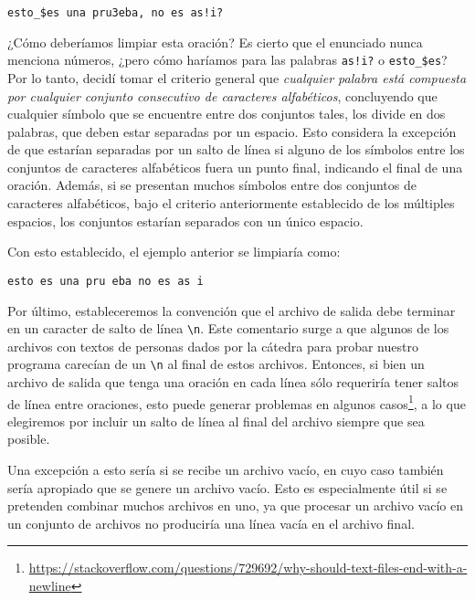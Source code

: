 \documentclass[a4paper]{article}
\begin{document}
\begin{tcolorbox}
    \texttt{esto\_\$es una pru3eba, no es as!i?}
\end{tcolorbox}

¿Cómo deberíamos limpiar esta oración? Es cierto que el enunciado nunca menciona números, ¿pero cómo haríamos para las palabras \texttt{as!i?} o \texttt{esto\_\$es}? Por lo tanto, decidí tomar el criterio general que \textit{cualquier palabra está compuesta por cualquier conjunto consecutivo de caracteres alfabéticos}, concluyendo que cualquier símbolo que se encuentre entre dos conjuntos tales, los divide en dos palabras, que deben estar separadas por un espacio. Esto considera la excepción de que estarían separadas por un salto de línea si alguno de los símbolos entre los conjuntos de caracteres alfabéticos fuera un punto final, indicando el final de una oración. Además, si se presentan muchos símbolos entre dos conjuntos de caracteres alfabéticos, bajo el criterio anteriormente establecido de los múltiples espacios, los conjuntos estarían separados con un único espacio.

Con esto establecido, el ejemplo anterior se limpiaría como:

\begin{tcolorbox}
    \texttt{esto es una pru eba no es as i}
\end{tcolorbox}

\vspace{10pt}

Por último, estableceremos la convención que el archivo de salida debe terminar en un caracter de salto de línea \texttt{\textbackslash{}n}. Este comentario surge a que algunos de los archivos con textos de personas dados por la cátedra para probar nuestro programa carecían de un \texttt{\textbackslash{}n} al final de estos archivos. Entonces, si bien un archivo de salida que tenga una oración en cada línea sólo requeriría tener saltos de línea entre oraciones, esto puede generar problemas en algunos casos\footnote{\url{https://stackoverflow.com/questions/729692/why-should-text-files-end-with-a-newline}}, a lo que elegiremos por incluir un salto de línea al final del archivo siempre que sea posible.

Una excepción a esto sería si se recibe un archivo vacío, en cuyo caso también sería apropiado que se genere un archivo vacío. Esto es especialmente útil si se pretenden combinar muchos archivos en uno, ya que procesar un archivo vacío en un conjunto de archivos no produciría una línea vacía en el archivo final.
\end{document}

